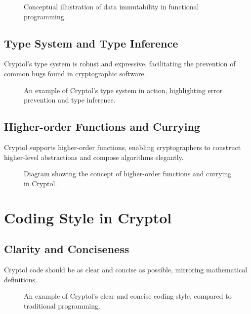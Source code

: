 \documentclass[12pt]{article}
\begin{document}
	\begin{figure}[ht]
		\centering
		\caption{Conceptual illustration of data immutability in functional programming.}
		\label{fig:immutability}
	\end{figure}
	
	\subsection*{Type System and Type Inference}
	Cryptol's type system is robust and expressive, facilitating the prevention of common bugs found in cryptographic software.
	
	\begin{figure}[ht]
		\centering
		\caption{An example of Cryptol's type system in action, highlighting error prevention and type inference.}
		\label{fig:type_system}
	\end{figure}
	
	\subsection*{Higher-order Functions and Currying}
	Cryptol supports higher-order functions, enabling cryptographers to construct higher-level abstractions and compose algorithms elegantly.
	
	\begin{figure}[ht]
		\centering
		\caption{Diagram showing the concept of higher-order functions and currying in Cryptol.}
		\label{fig:higher_order_functions}
	\end{figure}
	
	\section*{Coding Style in Cryptol}
	
	\subsection*{Clarity and Conciseness}
	Cryptol code should be as clear and concise as possible, mirroring mathematical definitions.
	
	\begin{figure}[ht]
		\centering
		\caption{An example of Cryptol's clear and concise coding style, compared to traditional programming.}
		\label{fig:coding_style}
	\end{figure}
	
\end{document}
